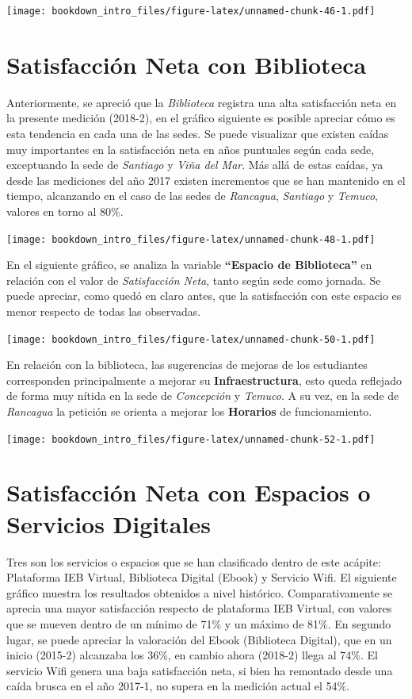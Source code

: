 \documentclass[]{book}
\begin{document}
\texttt{[image: bookdown\_intro\_files/figure-latex/unnamed-chunk-46-1.pdf]}

\section{Satisfacción Neta con
Biblioteca}\label{satisfaccion-neta-con-biblioteca}

Anteriormente, se apreció que la \emph{Biblioteca} registra una alta
satisfacción neta en la presente medición (2018-2), en el gráfico
siguiente es posible apreciar cómo es esta tendencia en cada una de las
sedes. Se puede visualizar que existen caídas muy importantes en la
satisfacción neta en años puntuales según cada sede, exceptuando la sede
de \emph{Santiago} y \emph{Viña del Mar}. Más allá de estas caídas, ya
desde las mediciones del año 2017 existen incrementos que se han
mantenido en el tiempo, alcanzando en el caso de las sedes de
\emph{Rancagua}, \emph{Santiago} y \emph{Temuco}, valores en torno al
80\%.

\texttt{[image: bookdown\_intro\_files/figure-latex/unnamed-chunk-48-1.pdf]}

En el siguiente gráfico, se analiza la variable \textbf{``Espacio de
Biblioteca''} en relación con el valor de \emph{Satisfacción Neta},
tanto según sede como jornada. Se puede apreciar, como quedó en claro
antes, que la satisfacción con este espacio es menor respecto de todas
las observadas.

\texttt{[image: bookdown\_intro\_files/figure-latex/unnamed-chunk-50-1.pdf]}

En relación con la biblioteca, las sugerencias de mejoras de los
estudiantes corresponden principalmente a mejorar su
\textbf{Infraestructura}, esto queda reflejado de forma muy nítida en la
sede de \emph{Concepción} y \emph{Temuco}. A su vez, en la sede de
\emph{Rancagua} la petición se orienta a mejorar los \textbf{Horarios}
de funcionamiento.

\texttt{[image: bookdown\_intro\_files/figure-latex/unnamed-chunk-52-1.pdf]}

\section{Satisfacción Neta con Espacios o Servicios
Digitales}\label{satisfaccion-neta-con-espacios-o-servicios-digitales}

Tres son los servicios o espacios que se han clasificado dentro de este
acápite: Plataforma IEB Virtual, Biblioteca Digital (Ebook) y Servicio
Wifi. El siguiente gráfico muestra los resultados obtenidos a nivel
histórico. Comparativamente se aprecia una mayor satisfacción respecto
de plataforma IEB Virtual, con valores que se mueven dentro de un mínimo
de 71\% y un máximo de 81\%. En segundo lugar, se puede apreciar la
valoración del Ebook (Biblioteca Digital), que en un inicio (2015-2)
alcanzaba los 36\%, en cambio ahora (2018-2) llega al 74\%. El servicio
Wifi genera una baja satisfacción neta, si bien ha remontado desde una
caída brusca en el año 2017-1, no supera en la medición actual el 54\%.
\end{document}
